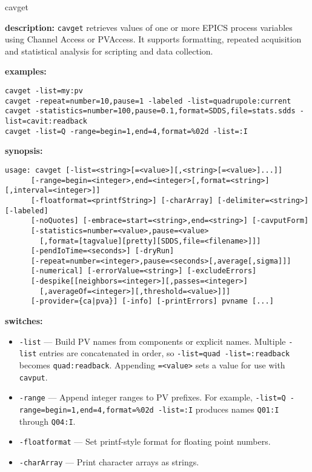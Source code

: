 %
%
\begin{sddsprog}{cavget}
\item \textbf{description:}
\verb+cavget+ retrieves values of one or more EPICS process variables using Channel Access or PVAccess.
It supports formatting, repeated acquisition and statistical analysis for scripting and data collection.
\item \textbf{examples:}
\begin{verbatim}
cavget -list=my:pv
cavget -repeat=number=10,pause=1 -labeled -list=quadrupole:current
cavget -statistics=number=100,pause=0.1,format=SDDS,file=stats.sdds -list=cavit:readback
cavget -list=Q -range=begin=1,end=4,format=%02d -list=:I
\end{verbatim}
\item \textbf{synopsis:}
\begin{verbatim}
usage: cavget [-list=<string>[=<value>][,<string>[=<value>]...]]
      [-range=begin=<integer>,end=<integer>[,format=<string>][,interval=<integer>]]
      [-floatformat=<printfString>] [-charArray] [-delimiter=<string>] [-labeled]
      [-noQuotes] [-embrace=start=<string>,end=<string>] [-cavputForm]
      [-statistics=number=<value>,pause=<value>
        [,format=[tagvalue][pretty][SDDS,file=<filename>]]]
      [-pendIoTime=<seconds>] [-dryRun]
      [-repeat=number=<integer>,pause=<seconds>[,average[,sigma]]]
      [-numerical] [-errorValue=<string>] [-excludeErrors]
      [-despike[[neighbors=<integer>][,passes=<integer>]
        [,averageOf=<integer>][,threshold=<value>]]]
      [-provider={ca|pva}] [-info] [-printErrors] pvname [...]
\end{verbatim}
\item \textbf{switches:}
\begin{itemize}
  \item {\tt -list} --- Build PV names from components or explicit names. Multiple
    \verb+-list+ entries are concatenated in order, so \verb+-list=quad -list=:readback+
    becomes \verb+quad:readback+. Appending \verb+=<value>+ sets a value for use with
    \verb+cavput+.
  \item {\tt -range} --- Append integer ranges to PV prefixes. For example,
    \verb+-list=Q -range=begin=1,end=4,format=%02d -list=:I+
    produces names \verb+Q01:I+ through \verb+Q04:I+.
  \item {\tt -floatformat} --- Set printf-style format for floating point numbers.
  \item {\tt -charArray} --- Print character arrays as strings.

\end{itemize}
\end{sddsprog}
